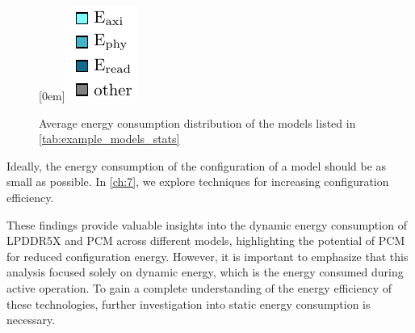 \begin{figure}[hbtp]
    \centering
    \hfill
    \subcaptionbox*{}[0em]{
        \includegraphics{assets/legend.pdf}
    }
    \hfill
    \caption{Average energy consumption distribution of the models listed in \cref{tab:example_models_stats}}
    \label{fig:example_models_avg_conf_proc}
\end{figure}

Ideally, the energy consumption of the configuration of a model should be as small as possible.
In \cref{ch:7}, we explore techniques for increasing configuration efficiency.
    
These findings provide valuable insights into the dynamic energy consumption of LPDDR5X and PCM across different models, highlighting the potential of PCM for reduced configuration energy.
However, it is important to emphasize that this analysis focused solely on dynamic energy, which is the energy consumed during active operation.
To gain a complete understanding of the energy efficiency of these technologies, further investigation into static energy consumption is necessary.

